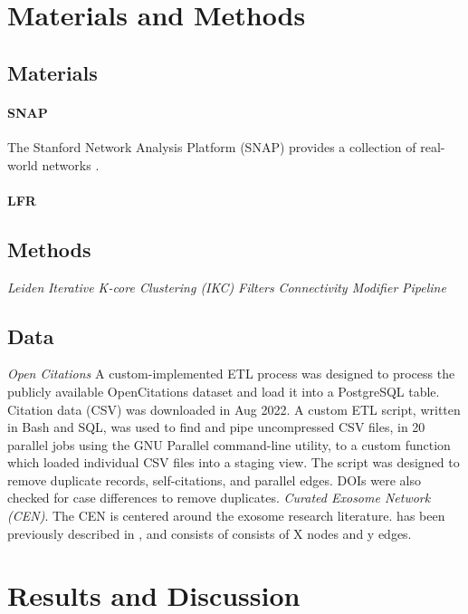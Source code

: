 \documentclass[12pt, oneside]{article}   	%
\begin{document}
\section{Materials and Methods}

\subsection{Materials}

\paragraph{SNAP}
The Stanford Network Analysis Platform (SNAP) provides a collection of real-world networks \citep{leskovec2016snap}.

\paragraph{LFR}


	
\subsection{Methods} 
\emph{Leiden}
\emph{Iterative K-core Clustering (IKC)}
\emph{Filters}
\emph{Connectivity Modifier}
\emph{Pipeline}

\subsection{Data}  \emph{Open Citations} A custom-implemented ETL process was designed to process the publicly available OpenCitations dataset and load it into a PostgreSQL table. Citation data (CSV) was downloaded in Aug 2022.
A custom ETL script, written in Bash and SQL, was used to find and pipe uncompressed CSV files, in 20 parallel jobs using the GNU Parallel command-line utility, to a custom function which loaded individual CSV files 
into a staging view. The script was designed to remove duplicate records, self-citations, and parallel edges. DOIs were also checked for case differences to remove duplicates.  \emph{Curated Exosome Network (CEN)}. The CEN is centered around the exosome research literature. has been previously described in \cite{Jakatdar_2022}, and consists of consists of X nodes and y edges.

\section{Results and Discussion}
\end{document}
